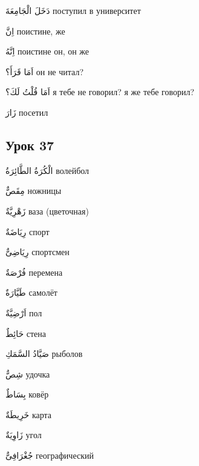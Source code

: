 \documentclass[a5paper]{article}
\newcommand\textstyleDropCaps[1]{#1}
\newcommand\textstyleCaptioncharacters[1]{#1}
\begin{document}
\textstyleCaptioncharacters{دَخَلَ الْجَامِعَةَ }\textstyleDropCaps{посту­пил в университет‎}

\textstyleCaptioncharacters{اِنَّ }\textstyleDropCaps{поистине, же‎}

\textstyleCaptioncharacters{اِنَّهُ }\textstyleDropCaps{поистине он, он же‎}

\textstyleCaptioncharacters{اَمَا قَرَأَ؟ }\textstyleDropCaps{он не читал?‎}

\textstyleCaptioncharacters{اَمَا قُلْتُ لَكَ؟ }\textstyleDropCaps{я тебе не говорил? я же тебе говорил?‎}

\textstyleCaptioncharacters{زَارَ }\textstyleDropCaps{посетил‎}

\subsection[Урок 37‎]{\textstyleDropCaps{Урок 37‎}}
\textstyleCaptioncharacters{الْكُرَةُ الطَّائِرَةُ }\textstyleDropCaps{волейбол‎}

\textstyleCaptioncharacters{مِقَصٌّ }\textstyleDropCaps{ножницы‎}

\textstyleCaptioncharacters{زَهْرِيَّةٌ }\textstyleDropCaps{ваза (цветочная)‎}

\textstyleCaptioncharacters{رِيَاضَةٌ }\textstyleDropCaps{спорт‎}

\textstyleCaptioncharacters{رِيَاضِىٌّ }\textstyleDropCaps{спортсмен‎}

\textstyleCaptioncharacters{فُرْصَةٌ }\textstyleDropCaps{перемена‎}

\textstyleCaptioncharacters{طَيَّارَةٌ }\textstyleDropCaps{самолёт‎}

\textstyleCaptioncharacters{اَرْضِيَّةٌ }\textstyleDropCaps{пол‎}

\textstyleCaptioncharacters{حَائِطٌ }\textstyleDropCaps{стена‎}

\textstyleCaptioncharacters{صَيَّادُ السَّمَكِ }\textstyleDropCaps{рыболов‎}

\textstyleCaptioncharacters{شِصٌّ }\textstyleDropCaps{удочка‎}

\textstyleCaptioncharacters{بِسَاطٌ }\textstyleDropCaps{ковёр‎}

\textstyleCaptioncharacters{خَرِيطَةٌ }\textstyleDropCaps{карта‎}

\textstyleCaptioncharacters{زَاوِيَةٌ }\textstyleDropCaps{угол‎}

\textstyleCaptioncharacters{جُغْرَافِىٌّ }\textstyleDropCaps{географический‎}
\end{document}

